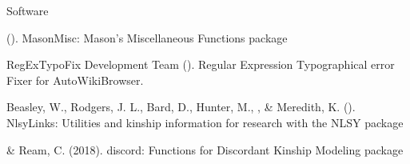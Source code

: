 \begin{rSection}{\textrm{Software}}%
\begin{etaremune}
\item\meb (\the\year). MasonMisc: Mason's Miscellaneous Functions \R package \href{https://CRAN.R-project.org/package=MasonMisc}{\small\color{blue}{CRAN.R-project.org/\allowbreak package\allowbreak =\allowbreak MasonMisc}}
\item RegExTypoFix Development Team (\the\year). Regular Expression Typographical error Fixer for AutoWikiBrowser. \href{https://en.wikipedia.org/wiki/Wikipedia:AutoWikiBrowser/Typos}{\small\color{blue}{en.wikipedia.org\allowbreak /wiki/\allowbreak Wikipedia:\allowbreak AutoWikiBrowser/\allowbreak Typos}}
\item  Beasley, W., Rodgers, J. L., Bard, D., Hunter, M., \meb, \& Meredith, K. (\the\year). NlsyLinks: Utilities and kinship information for research with the NLSY \R package \href{https://cran.r-project.org/web/packages/NlsyLinks}{\small\color{blue}{CRAN.R-project.org/\allowbreak package\allowbreak =\allowbreak NlsyLinks}}
\item\meb \& Ream, C. (2018). discord: Functions for Discordant Kinship Modeling \R package \href{https://CRAN.R-project.org/package=discord}{\small\color{blue}{CRAN.R-project.org/\allowbreak package\allowbreak =\allowbreak discord}}

\end{etaremune}
\end{rSection}